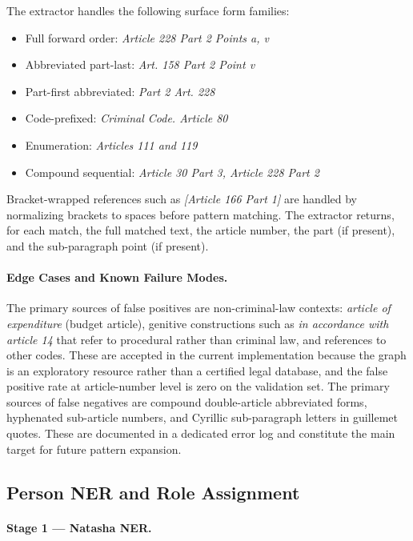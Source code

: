 \documentclass[11pt]{article}
\begin{document}
The extractor handles the following surface form families:
\begin{itemize}
\item Full forward order: \textit{Article 228 Part 2 Points a, v}
\item Abbreviated part-last: \textit{Art. 158 Part 2 Point v}
\item Part-first abbreviated: \textit{Part 2 Art. 228}
\item Code-prefixed: \textit{Criminal Code. Article 80}
\item Enumeration: \textit{Articles 111 and 119}
\item Compound sequential: \textit{Article 30 Part 3, Article 228 Part 2}
\end{itemize}

Bracket-wrapped references such as \textit{[Article 166 Part 1]} are handled by normalizing brackets to spaces before pattern matching. The extractor returns, for each match, the full matched text, the article number, the part (if present), and the sub-paragraph point (if present).

\paragraph{Edge Cases and Known Failure Modes.}

The primary sources of false positives are non-criminal-law contexts: \textit{article of expenditure} (budget article), genitive constructions such as \textit{in accordance with article 14} that refer to procedural rather than criminal law, and references to other codes. These are accepted in the current implementation because the graph is an exploratory resource rather than a certified legal database, and the false positive rate at article-number level is zero on the validation set. The primary sources of false negatives are compound double-article abbreviated forms, hyphenated sub-article numbers, and Cyrillic sub-paragraph letters in guillemet quotes. These are documented in a dedicated error log and constitute the main target for future pattern expansion.

\subsection{Person NER and Role Assignment}

\paragraph{Stage 1 --- Natasha NER.}
\end{document}
